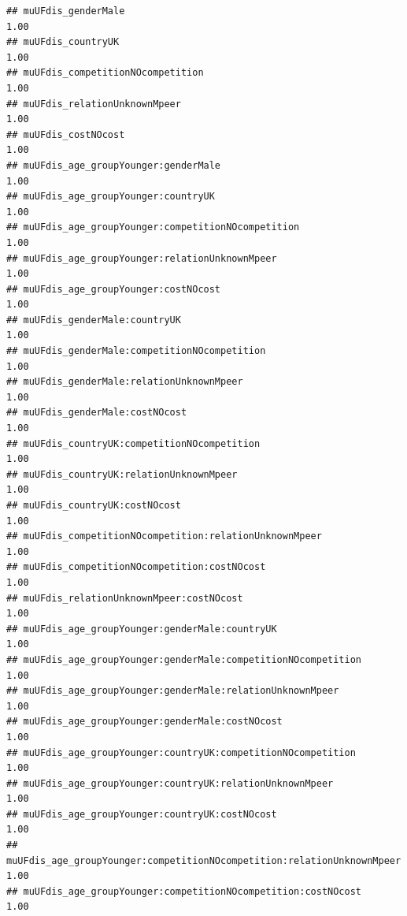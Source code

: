 \documentclass[
]{article}
\begin{document}
\begin{verbatim}
## muUFdis_genderMale                                                                1.00
## muUFdis_countryUK                                                                 1.00
## muUFdis_competitionNOcompetition                                                  1.00
## muUFdis_relationUnknownMpeer                                                      1.00
## muUFdis_costNOcost                                                                1.00
## muUFdis_age_groupYounger:genderMale                                               1.00
## muUFdis_age_groupYounger:countryUK                                                1.00
## muUFdis_age_groupYounger:competitionNOcompetition                                 1.00
## muUFdis_age_groupYounger:relationUnknownMpeer                                     1.00
## muUFdis_age_groupYounger:costNOcost                                               1.00
## muUFdis_genderMale:countryUK                                                      1.00
## muUFdis_genderMale:competitionNOcompetition                                       1.00
## muUFdis_genderMale:relationUnknownMpeer                                           1.00
## muUFdis_genderMale:costNOcost                                                     1.00
## muUFdis_countryUK:competitionNOcompetition                                        1.00
## muUFdis_countryUK:relationUnknownMpeer                                            1.00
## muUFdis_countryUK:costNOcost                                                      1.00
## muUFdis_competitionNOcompetition:relationUnknownMpeer                             1.00
## muUFdis_competitionNOcompetition:costNOcost                                       1.00
## muUFdis_relationUnknownMpeer:costNOcost                                           1.00
## muUFdis_age_groupYounger:genderMale:countryUK                                     1.00
## muUFdis_age_groupYounger:genderMale:competitionNOcompetition                      1.00
## muUFdis_age_groupYounger:genderMale:relationUnknownMpeer                          1.00
## muUFdis_age_groupYounger:genderMale:costNOcost                                    1.00
## muUFdis_age_groupYounger:countryUK:competitionNOcompetition                       1.00
## muUFdis_age_groupYounger:countryUK:relationUnknownMpeer                           1.00
## muUFdis_age_groupYounger:countryUK:costNOcost                                     1.00
## muUFdis_age_groupYounger:competitionNOcompetition:relationUnknownMpeer            1.00
## muUFdis_age_groupYounger:competitionNOcompetition:costNOcost                      1.00

\end{verbatim}
\end{document}
